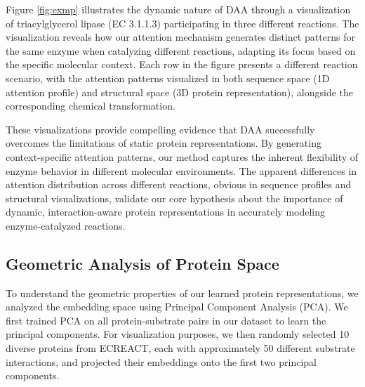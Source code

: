 \documentclass[sigconf]{acmart}
\begin{document}


Figure \ref{fig:exmp} illustrates the dynamic nature of DAA through a visualization of triacylglycerol lipase (EC 3.1.1.3) participating in three different reactions. The visualization reveals how our attention mechanism generates distinct patterns for the same enzyme when catalyzing different reactions, adapting its focus based on the specific molecular context. Each row in the figure presents a different reaction scenario, with the attention patterns visualized in both sequence space (1D attention profile) and structural space (3D protein representation), alongside the corresponding chemical transformation.

These visualizations provide compelling evidence that DAA successfully overcomes the limitations of static protein representations. By generating context-specific attention patterns, our method captures the inherent flexibility of enzyme behavior in different molecular environments. The apparent differences in attention distribution across different reactions, obvious in sequence profiles and structural visualizations, validate our core hypothesis about the importance of dynamic, interaction-aware protein representations in accurately modeling enzyme-catalyzed reactions.




\subsection{Geometric Analysis of Protein Space}




To understand the geometric properties of our learned protein representations, we analyzed the embedding space using Principal Component Analysis (PCA). We first trained PCA on all protein-substrate pairs in our dataset to learn the principal components. For visualization purposes, we then randomly selected 10 diverse proteins from ECREACT, each with approximately 50 different substrate interactions, and projected their embeddings onto the first two principal components.
\end{document}
